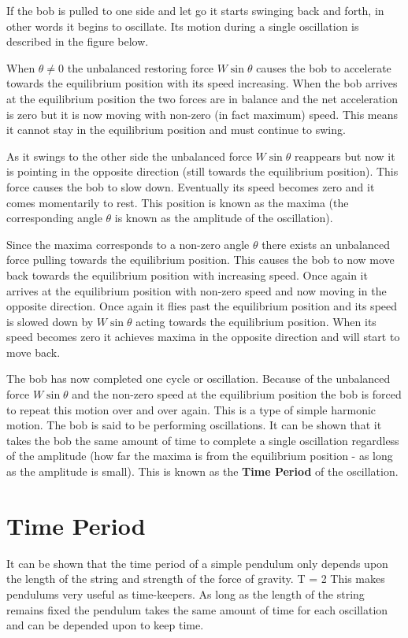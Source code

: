    If the bob is pulled to one side and let go it starts swinging back and forth, in other words it begins to oscillate. Its motion during a single oscillation is described in the figure below.

   \vspace{0.5\baselineskip}
   
   \vspace{0.2\baselineskip}

   When $\theta \neq 0$ the unbalanced restoring force $W \sin \theta$ causes the bob to accelerate towards the equilibrium position with its speed increasing. When the bob arrives at the equilibrium position the two forces are in balance and the net acceleration is zero but it is now moving with non-zero (in fact maximum) speed. This means it cannot stay in the equilibrium position and must continue to swing.

   As it swings to the other side the unbalanced force $W \sin \theta$ reappears but now it is pointing in the opposite direction (still towards the equilibrium position). This force causes the bob to slow down. Eventually its speed becomes zero and it comes momentarily to rest. This position is known as the maxima (the corresponding angle $\theta$ is known as the amplitude of the oscillation).

   Since the maxima corresponds to a non-zero angle $\theta$ there exists an unbalanced force pulling towards the equilibrium position. This causes the bob to now move back towards the equilibrium position with increasing speed. Once again it arrives at the equilibrium position with non-zero speed and now moving in the opposite direction. Once again it flies past the equilibrium position and its speed is slowed down by $W \sin \theta$ acting towards the equilibrium position. When its speed becomes zero it achieves maxima in the opposite direction and will start to move back.

   The bob has now completed one cycle or oscillation. Because of the unbalanced force $W \sin \theta$ and the non-zero speed at the equilibrium position the bob is forced to repeat this motion over and over again. This is a type of simple harmonic motion. The bob is said to be performing oscillations. It can be shown that it takes the bob the same amount of time to complete a single oscillation regardless of the amplitude (how far the maxima is from the equilibrium position - as long as the amplitude is small). This is known as the \textbf{Time Period} of the oscillation.

\section{Time Period}

   It can be shown that the time period of a simple pendulum only depends upon the length of the string and strength of the force of gravity.
   \beq
      T = 2 \pi {}
   \eeq
   This makes pendulums very useful as time-keepers. As long as the length of the string remains fixed the pendulum takes the same amount of time for each oscillation and can be depended upon to keep time.

